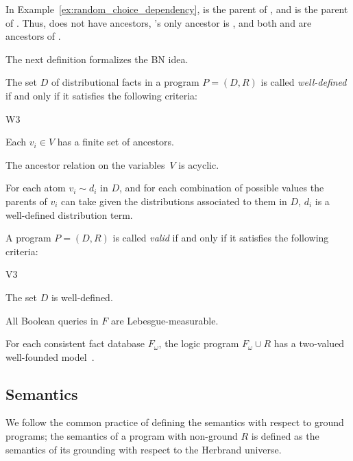 \begin{example}\label{ex:random_choice_dependency_parents}
In Example~\ref{ex:random_choice_dependency},  is the parent of , and  is the parent of . Thus,  does not have ancestors, 's only ancestor is , and both  and  are ancestors of .
\end{example}


The next definition formalizes the BN idea.
\begin{definition}\label{def:well-defd-facts}
The set $D$ of distributional facts in a program $P=(D,R)$ is called \emph{well-defined} if and only if it satisfies the following criteria:
\begin{labeling}{W3}
\item[W1] Each $v_i\in V$ has a finite set of ancestors.
\item[W2] The ancestor relation on the variables~$V$ is acyclic.
\item[W3] For each atom $v_i \sim d_i$ in $D$, and for each combination of possible values the parents of $v_i$ can take given the distributions associated to them in $D$, 
$d_i$ is a well-defined distribution term. 
\end{labeling}  
\end{definition}




\begin{definition}\label{def:core-valid}
A \dcproblogsty program $P=(D,R)$ is called \emph{valid} if and only if it satisfies the following criteria:
\begin{labeling}{V3}
\item[V1] The set $D$ is well-defined. 
\item[V2] All Boolean queries in $F$ are Lebesgue-measurable.
\item[V3] For each consistent fact database $F_{\omega}$, the logic program $F_{\omega}\cup R$ has a two-valued well-founded model~\citep{van1991well}.  
\end{labeling}
\end{definition}





\subsection{Semantics}
We follow the common practice of defining the semantics with respect to ground programs; the semantics of a program with non-ground $R$ is defined as the semantics of its grounding with respect to the  Herbrand universe.


